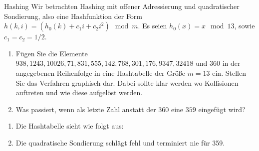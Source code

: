 \documentclass{article}
\begin{document}
\begin{exercise}{Hashing}
  Wir betrachten Hashing mit offener Adressierung und quadratischer Sondierung, also eine Hashfunktion der Form $h(k, i) = (h_0(k) + c_1i + c_2i^2) \mod m$. Es seien $h_0(x) = x \mod 13$, sowie $c_1 = c_2 = 1/2$.
  \begin{enumerate}
    \item Fügen Sie die Elemente $938, 1243, 10026, 71, 831, 555, 142, 768, 301, 176, 9347, 32418$ und $360$ in der angegebenen Reihenfolge in eine Hashtabelle der Größe $m = 13$ ein. Stellen Sie das Verfahren graphisch dar. Dabei sollte klar werden wo Kollisionen auftreten und wie diese aufgelöst werden.
    \item Was passiert, wenn als letzte Zahl anstatt der $360$ eine $359$ eingefügt wird?
  \end{enumerate}

  \begin{solution}
    \begin{enumerate}
      \item Die Hashtabelle sieht wie folgt aus:\par
            
      \item Die quadratische Sondierung schlägt fehl und terminiert nie für 359.
    \end{enumerate}
  \end{solution}

\end{exercise}
\end{document}
